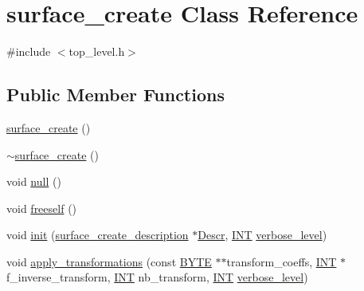 \hypertarget{classsurface__create}{}\section{surface\+\_\+create Class Reference}
\label{classsurface__create}


{\ttfamily \#include $<$top\+\_\+level.\+h$>$}

\subsection*{Public Member Functions}
\begin{DoxyCompactItemize}
\item 
\mbox{\hyperlink{classsurface__create_a62fb46d9347035ba43ce8cce05721927}{surface\+\_\+create}} ()
\item 
\mbox{\hyperlink{classsurface__create_a8d3e2661a30ab4177c01e25f7cdc01cb}{$\sim$surface\+\_\+create}} ()
\item 
void \mbox{\hyperlink{classsurface__create_ae2a62125aabf1ba9791bdd6455c1aa28}{null}} ()
\item 
void \mbox{\hyperlink{classsurface__create_a5a9aff32d0fff342dd6e09fdaba9fd82}{freeself}} ()
\item 
void \mbox{\hyperlink{classsurface__create_ab0db5c12825f778e3caf8aa4da02eb06}{init}} (\mbox{\hyperlink{classsurface__create__description}{surface\+\_\+create\+\_\+description}} $\ast$\mbox{\hyperlink{classsurface__create_ab552f7961d6954c8e3ead8cc9acb5ccf}{Descr}}, \mbox{\hyperlink{galois_8h_a09fddde158a3a20bd2dcadb609de11dc}{I\+NT}} \mbox{\hyperlink{simeon_8_c_a818073fbcc2f439e7c56952f67386122}{verbose\+\_\+level}})
\item 
void \mbox{\hyperlink{classsurface__create_a880646331f352cb7112dbd4c56e5ac57}{apply\+\_\+transformations}} (const \mbox{\hyperlink{galois_8h_ab6cc7b4aeb6ea31aba2b3fbfc83ff5e6}{B\+Y\+TE}} $\ast$$\ast$transform\+\_\+coeffs, \mbox{\hyperlink{galois_8h_a09fddde158a3a20bd2dcadb609de11dc}{I\+NT}} $\ast$f\+\_\+inverse\+\_\+transform, \mbox{\hyperlink{galois_8h_a09fddde158a3a20bd2dcadb609de11dc}{I\+NT}} nb\+\_\+transform, \mbox{\hyperlink{galois_8h_a09fddde158a3a20bd2dcadb609de11dc}{I\+NT}} \mbox{\hyperlink{simeon_8_c_a818073fbcc2f439e7c56952f67386122}{verbose\+\_\+level}})
\end{DoxyCompactItemize}
